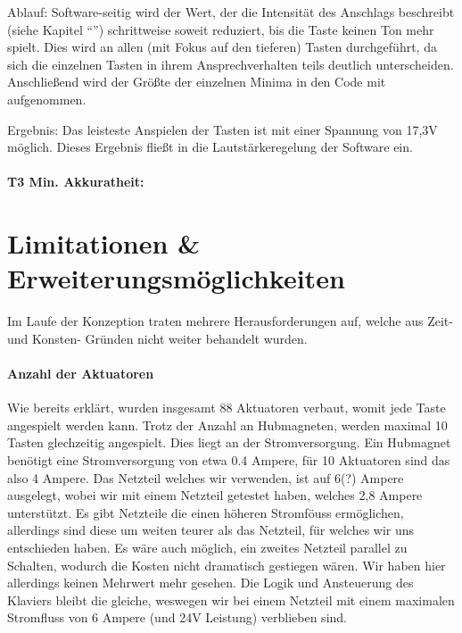 Ablauf: Software-seitig wird der Wert, der die Intensität des Anschlags beschreibt (siehe Kapitel \enquote{}) schrittweise soweit reduziert, bis die Taste keinen Ton mehr spielt.
Dies wird an allen (mit Fokus auf den tieferen) Tasten durchgeführt, da sich die einzelnen Tasten in ihrem Ansprechverhalten teils deutlich unterscheiden. %
Anschließend wird der Größte der einzelnen Minima in den Code mit aufgenommen.

Ergebnis: Das leisteste Anspielen der Tasten ist mit einer Spannung von 17,3V möglich.
Dieses Ergebnis fließt in die Lautstärkeregelung der Software ein.


\paragraph{T3 Min. Akkuratheit:}











\section{Limitationen \& Erweiterungsmöglichkeiten} \label{ergebnisse-limitationen}

Im Laufe der Konzeption traten mehrere Herausforderungen auf, welche aus Zeit- und Konsten- Gründen nicht weiter
behandelt wurden.
\paragraph{Anzahl der Aktuatoren}
Wie bereits erklärt, wurden insgesamt 88 Aktuatoren verbaut, womit jede Taste angespielt werden kann. Trotz der Anzahl an
Hubmagneten, werden maximal 10 Tasten glechzeitig angespielt. Dies liegt an der Stromversorgung. Ein Hubmagnet benötigt
eine Stromversorgung von etwa 0.4 Ampere, für 10 Aktuatoren sind das also 4 Ampere. Das Netzteil welches wir verwenden, ist auf
6(?) Ampere ausgelegt, wobei wir mit einem Netzteil getestet haben, welches 2,8 Ampere unterstützt. Es gibt Netzteile die
einen höheren Stromföuss ermöglichen, allerdings sind diese um weiten teurer als das Netzteil, für welches wir uns entschieden haben.
Es wäre auch möglich, ein zweites Netzteil parallel zu Schalten, wodurch die Kosten nicht dramatisch gestiegen wären.
Wir haben hier allerdings keinen Mehrwert mehr gesehen. Die Logik und Ansteuerung des Klaviers bleibt die gleiche, weswegen
wir bei einem Netzteil mit einem maximalen Stromfluss von 6 Ampere (und 24V Leistung) verblieben sind.


